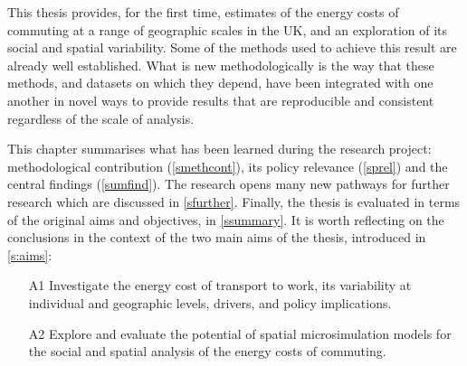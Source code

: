 This thesis provides, for the first time,
estimates of the energy costs of commuting at a range of geographic scales in
the UK, and an exploration of its social and spatial
variability. Some of the methods
used to achieve this result are already well established. What is new
methodologically is the way that these methods, and datasets on which
they depend, have been integrated with one another in novel ways
to provide results that are reproducible
and consistent regardless of the scale of analysis.

This chapter summarises what has
been learned during the research project:
methodological  contribution (\cref{smethcont}), its policy relevance
(\cref{sprel}) and the central findings (\cref{sumfind}). The research opens many
new pathways for further research which are discussed in \cref{sfurther}.
Finally, the thesis is evaluated in terms of the original aims and objectives,
in \cref{ssummary}. It is worth reflecting on the conclusions in the
context of the two
main aims of the thesis, introduced in \cref{s:aims}:
\begin{itemize}
 \item[A1] Investigate the energy cost of transport to work, its variability
at individual and geographic levels, drivers, and policy implications.
  \item[A2] Explore and evaluate the potential of spatial microsimulation
models for the social and spatial analysis of the energy costs of commuting.
\end{itemize}

